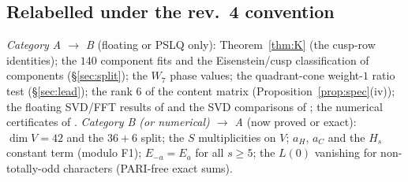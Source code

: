 \subsection{Relabelled under the rev.~4 convention}
\emph{Category A $\to$ B} (floating or PSLQ only): Theorem~\ref{thm:K} (the cusp-row identities); the $140$ component fits and the Eisenstein/cusp classification of
components (\S\ref{sec:split}); the $W_7$ phase values; the quadrant-cone weight-$1$ ratio test (\S\ref{sec:lead}); the rank $6$ of the content matrix
(Proposition~\ref{prop:spec}(iv)); the floating SVD/FFT results of  and the SVD comparisons of ; the numerical certificates of .
\emph{Category B (or numerical) $\to$ A} (now proved or exact): $\dim V=42$ and the $36+6$ split; the $S$ multiplicities on $V$; $a_H$, $a_C$ and the $H_s$ constant term
(modulo F1); $E_{-a}=E_a$ for all $s\ge5$; the $L(0)$ vanishing for non-totally-odd characters (PARI-free exact sums).

